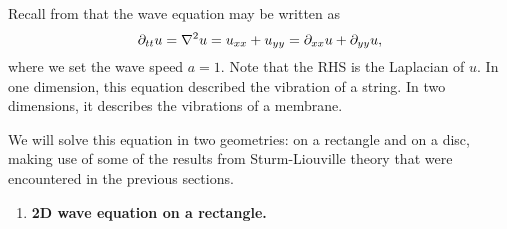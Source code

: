 Recall from  that the wave equation may be written as
\begin{equation}
	\partial_{tt}u = \nabla^2u = u_{xx} + u_{yy} = \partial_{xx}u + \partial_{yy}u,
\end{equation}
where we set the wave speed $a=1$. Note that the RHS is the Laplacian of $u$. In one dimension, this equation described the vibration of a string. In two dimensions, it describes the vibrations of a membrane.

We will solve this equation in two geometries: on a rectangle and on a disc, making use of some of the results from Sturm-Liouville theory that were encountered in the previous sections.

\begin{enumerate}
	\item \textbf{2D wave equation on a rectangle.}
	

\end{enumerate}
